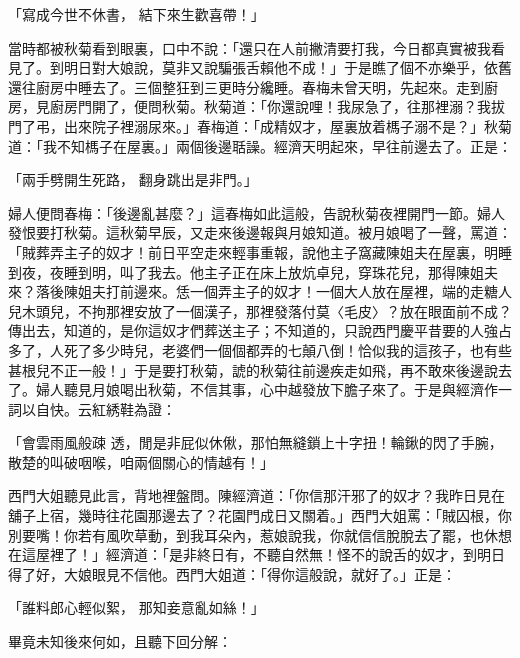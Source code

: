 \begin{showcontents}{}
「寫成今世不休書，  結下來生歡喜帶！」

當時都被秋菊看到眼裏，口中不說：「還只在人前撇清要打我，今日都真實被我看見了。到明日對大娘說，莫非又說騙張舌賴他不成！」于是瞧了個不亦樂乎，依舊還往廚房中睡去了。三個整狂到三更時分纔睡。春梅未曾天明，先起來。走到廚房，見廚房門開了，便問秋菊。秋菊道：「你還說哩！我尿急了，往那裡溺？我拔門了弔，出來院子裡溺尿來。」春梅道：「成精奴才，屋裏放着榪子溺不是？」秋菊道：「我不知榪子在屋裏。」兩個後邊聒譟。經濟天明起來，早往前邊去了。正是：

「兩手劈開生死路，  翻身跳出是非門。」

婦人便問春梅：「後邊亂甚麼？」這春梅如此這般，告說秋菊夜裡開門一節。婦人發恨要打秋菊。這秋菊早辰，又走來後邊報與月娘知道。被月娘喝了一聲，罵道：「賊葬弄主子的奴才！前日平空走來輕事重報，說他主子窩藏陳姐夫在屋裏，明睡到夜，夜睡到明，叫了我去。他主子正在床上放炕卓兒，穿珠花兒，那得陳姐夫來？落後陳姐夫打前邊來。恁一個弄主子的奴才！一個大人放在屋裡，端的走糖人兒木頭兒，不拘那裡安放了一個漢子，那裡發落付莫〈毛皮〉？放在眼面前不成？傳出去，知道的，是你這奴才們葬送主子；不知道的，只說西門慶平昔要的人強占多了，人死了多少時兒，老婆們一個個都弄的七顛八倒！恰似我的這孩子，也有些甚根兒不正一般！」于是要打秋菊，諕的秋菊往前邊疾走如飛，再不敢來後邊說去了。婦人聽見月娘喝出秋菊，不信其事，心中越發放下膽子來了。于是與經濟作一詞以自快。云紅綉鞋為證：

「會雲雨風般疎 透，閒是非屁似休偢，那怕無縫鎖上十字扭！輪鍬的閃了手腕，散楚的叫破咽喉，咱兩個關心的情越有！」

西門大姐聽見此言，背地裡盤問。陳經濟道：「你信那汗邪了的奴才？我昨日見在舖子上宿，幾時往花園那邊去了？花園門成日又關着。」西門大姐罵：「賊囚根，你別要嘴！你若有風吹草動，到我耳朵內，惹娘說我，你就信信脫脫去了罷，也休想在這屋裡了！」經濟道：「是非終日有，不聽自然無！怪不的說舌的奴才，到明日得了好，大娘眼見不信他。西門大姐道：「得你這般說，就好了。」正是：

「誰料郎心輕似絮，  那知妾意亂如絲！」

畢竟未知後來何如，且聽下回分解：





\end{showcontents}


